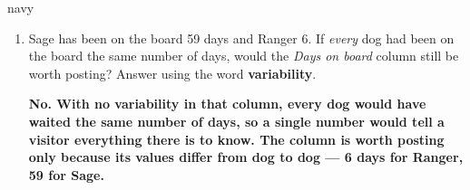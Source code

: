 \documentclass[10pt]{article}
\newcommand{\answerspace}[2]{\par\nopagebreak\noindent\begin{minipage}[t][#1][t]{\linewidth}%
  \color{keyred}\bfseries #2\end{minipage}\par}
\begin{document}
\begin{scenariobox}{navy}
\begin{enumerate}[label=\textbf{\alph*.}, leftmargin=1.8em, itemsep=7pt]
        \vspace{3pt}
        \emph{How much does Zeke weigh?} \qquad\qquad \emph{How much do these dogs weigh?}
        \answerspace{1.4cm}{Zeke's weight is a single \emph{value} --- the entry 70 where Zeke's
        row meets the Weight column. ``How much do these dogs weigh?'' needs the entire
        \emph{variable}: all eight entries in the Weight column.}
  \item Sage has been on the board 59 days and Ranger 6. If \emph{every} dog had been on the
        board the same number of days, would the \emph{Days on board} column still be worth
        posting? Answer using the word \textbf{variability}.
        \answerspace{1.8cm}{No. With no \textbf{variability} in that column, every dog would have
        waited the same number of days, so a single number would tell a visitor everything there
        is to know. The column is worth posting only because its values differ from dog to dog
        --- 6 days for Ranger, 59 for Sage.}
\end{enumerate}
\end{scenariobox}

\vspace{0.10in}
\end{document}
